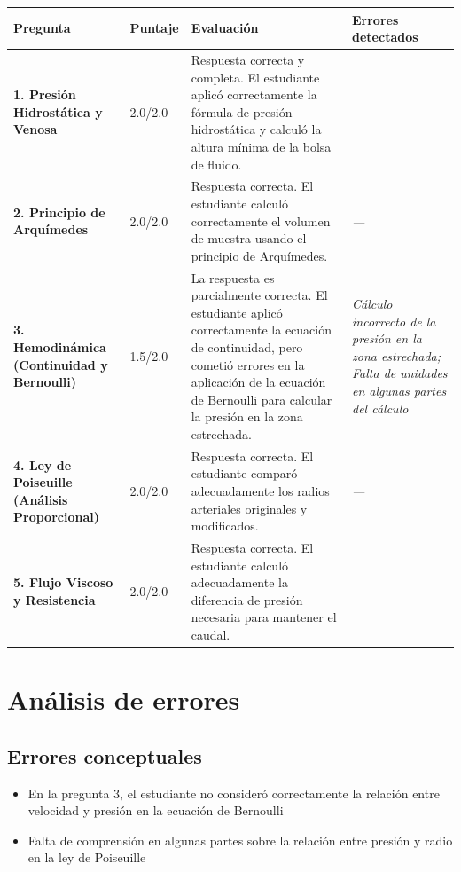\documentclass[11pt,a4paper]{article}
\begin{document}
\begin{longtable}{>{\bfseries}p{2.8cm} p{1.6cm} p{7.0cm} p{2.8cm}}
  \toprule
  \textbf{Pregunta} & \textbf{Puntaje} & \textbf{Evaluación} & \textbf{Errores detectados} \\
  \midrule
  \endhead
  \bottomrule
  \endfoot
    \textbf{1. Presión Hidrostática y Venosa} & 2.0/2.0 & Respuesta correcta y completa. El estudiante aplicó correctamente la fórmula de presión hidrostática y calculó la altura mínima de la bolsa de fluido. & \textit{---} \\
    \midrule
    \textbf{2. Principio de Arquímedes} & 2.0/2.0 & Respuesta correcta. El estudiante calculó correctamente el volumen de muestra usando el principio de Arquímedes. & \textit{---} \\
    \midrule
    \textbf{3. Hemodinámica (Continuidad y Bernoulli)} & 1.5/2.0 & La respuesta es parcialmente correcta. El estudiante aplicó correctamente la ecuación de continuidad, pero cometió errores en la aplicación de la ecuación de Bernoulli para calcular la presión en la zona estrechada. & \textit{Cálculo incorrecto de la presión en la zona estrechada; Falta de unidades en algunas partes del cálculo} \\
    \midrule
    \textbf{4. Ley de Poiseuille (Análisis Proporcional)} & 2.0/2.0 & Respuesta correcta. El estudiante comparó adecuadamente los radios arteriales originales y modificados. & \textit{---} \\
    \midrule
    \textbf{5. Flujo Viscoso y Resistencia} & 2.0/2.0 & Respuesta correcta. El estudiante calculó adecuadamente la diferencia de presión necesaria para mantener el caudal. & \textit{---} \\
    \midrule
\end{longtable}

\section*{Análisis de errores}

\subsection*{Errores conceptuales}
\begin{itemize}[leftmargin=1.5em, itemsep=2pt]
  \item En la pregunta 3, el estudiante no consideró correctamente la relación entre velocidad y presión en la ecuación de Bernoulli
  \item Falta de comprensión en algunas partes sobre la relación entre presión y radio en la ley de Poiseuille
\end{itemize}
\end{document}
